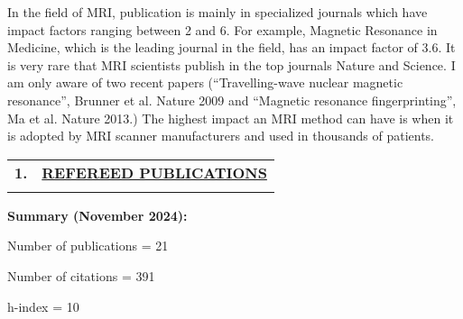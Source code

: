 \documentclass[11pt,notitlepage,english]{report}
\begin{document}
In the field of MRI, publication is mainly in specialized journals which have
impact factors ranging between 2 and 6. For example, Magnetic Resonance in
Medicine, which is the leading journal in the field, has an impact factor of
3.6. It is very rare that MRI scientists publish in the top journals Nature and
Science. I am only aware of two recent papers (“Travelling-wave nuclear
magnetic resonance”, Brunner et al. Nature 2009 and “Magnetic resonance
fingerprinting”, Ma et al. Nature 2013.) The highest impact an MRI method can
have is when it is adopted by MRI scanner manufacturers and used in thousands
of patients.

\begin{tabular}{L{.5cm} L{18.9cm} }
  \\
  \textbf{1.}  & \underline{\textbf{REFEREED PUBLICATIONS}}                                      \\
  \\
\end{tabular}

\textbf{Summary (November 2024):} 

\hspace{1cm} Number of publications = 21

\hspace{1cm} Number of citations = 391

\hspace{1cm} h-index = 10

\end{document}
